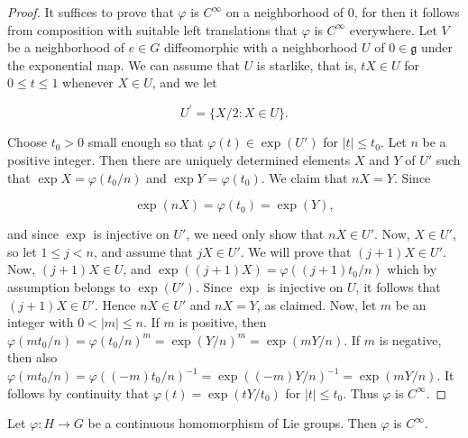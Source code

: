 \begin{proof}
It suffices to prove that $\varphi$ is $C^{\infty}$ on a neighborhood of $0$, for then it follows from composition with suitable left translations that $\varphi$ is $C^{\infty}$ everywhere. Let $V$ be a neighborhood of $e\in G$ diffeomorphic with a neighborhood $U$ of $0\in\mathfrak{g}$ under the exponential map. We can assume that $U$ is starlike, that is, $tX\in U$ for $0\leq t\leq 1$ whenever $X\in U$, and we let

\[
U^{\prime}=\{X/2\colon X\in U\}.
\]

Choose $t_0 > 0$ small enough so that $\varphi(t) \in \exp(U')$ for $|t| \leq t_0$. Let $n$ be a positive integer. Then there are uniquely determined elements $X$ and $Y$ of $U'$ such that $\exp X = \varphi(t_0/n)$ and $\exp Y = \varphi(t_0)$. We claim that $nX = Y$. Since

\[
\exp(n X)=\varphi(t_{0})=\exp(Y),
\]

and since  $ \exp $ is injective on  $ U' $, we need only show that  $ nX \in U' $. Now,  $ X \in U' $, so let  $ 1 \leq j < n $, and assume that  $ jX \in U' $. We will prove that  $ (j+1)X \in U' $. Now,  $ (j+1)X \in U $, and  $ \exp((j+1)X) = \varphi((j+1)t_0/n) $ which by assumption belongs to  $ \exp(U') $. Since  $ \exp $ is injective on  $ U $, it follows that  $ (j+1)X \in U' $. Hence  $ nX \in U' $ and  $ nX = Y $, as claimed. Now, let  $ m $ be an integer with  $ 0 < |m| \leq n $. If  $ m $ is positive, then  $ \varphi(m t_0/n) = \varphi(t_0/n)^m = \exp(Y/n)^m = \exp(m Y/n) $. If  $ m $ is negative, then also  $ \varphi(m t_0/n) = \varphi((-m)t_0/n)^{-1} = \exp((-m)Y/n)^{-1} = \exp(m Y/n) $. It follows by continuity that  $ \varphi(t) = \exp(tY/t_{0}) $ for  $ |t| \leq t_0 $. Thus  $ \varphi $ is  $ C^\infty $.

\end{proof}

\begin{theorem}\label{thm:3.39}
Let $\varphi: H \to G$ be a continuous homomorphism of Lie groups. Then $\varphi$ is $C^\infty$.

\end{theorem}


